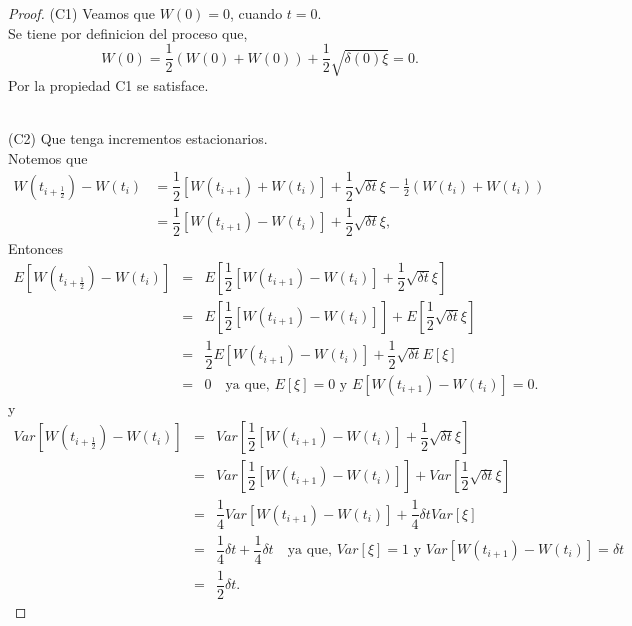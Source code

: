 \documentclass[
  letterpaper,
  DIV=11,
  numbers=noendperiod]{scrreprt}
\theoremstyle{plain}
\theoremstyle{definition}
\theoremstyle{remark}
\begin{document}
\begin{proof}

(C1) Veamos que \(W\left(0\right)=0\), cuando \(t=0\).\\
Se tiene por definicion del proceso que, \[
W\left(0\right)=\frac{1}{2}(W(0)+W(0))+\frac{1}{2}\sqrt{\delta(0)\xi}=0.
\] Por la propiedad C1 se satisface.\\
\strut \\
(C2) Que tenga incrementos estacionarios.\\
Notemos que \[
\begin{align*}
W(t_{i+\frac{1}{2}})-W(t_{i}) & = \dfrac{1}{2}\left[W\left(t_{i+1}\right)+W\left(t_{i}\right)\right]+\dfrac{1}{2}\sqrt{\delta t}\xi-\frac{1}{2}(W(t_{i})+W(t_{i}))\\
& = \dfrac{1}{2}\left[W\left(t_{i+1}\right)-W\left(t_{i}\right)\right]+\dfrac{1}{2}\sqrt{\delta t}\xi,
\end{align*}
\] Entonces \[
\begin{eqnarray*}
E\left[W(t_{i+\frac{1}{2}})-W(t_{i})\right] & = & E\left[\dfrac{1}{2}\left[W\left(t_{i+1}\right)-W\left(t_{i}\right)\right]+\dfrac{1}{2}\sqrt{\delta t}\xi\right]\\
& = & E\left[\dfrac{1}{2}\left[W\left(t_{i+1}\right)-W\left(t_{i}\right)\right]\right]+E\left[\dfrac{1}{2}\sqrt{\delta t}\xi\right]\\
& = & \dfrac{1}{2}E\left[W\left(t_{i+1}\right)-W\left(t_{i}\right)\right]+\dfrac{1}{2}\sqrt{\delta t}E\left[\xi\right]\\
& = & 0\quad\text{ya que, }E\left[\xi\right]=0\text{ y }E\left[W\left(t_{i+1}\right)-W\left(t_{i}\right)\right]=0.
\end{eqnarray*}
\] y \[
\begin{eqnarray}
Var\left[W(t_{i+\frac{1}{2}})-W(t_{i})\right]& = & Var\left[\dfrac{1}{2}\left[W\left(t_{i+1}\right)-W\left(t_{i}\right)\right]+\dfrac{1}{2}\sqrt{\delta t}\xi\right]\\
& = & Var\left[\dfrac{1}{2}\left[W\left(t_{i+1}\right)-W\left(t_{i}\right)\right]\right]+Var\left[\dfrac{1}{2}\sqrt{\delta t}\xi\right]\\
& = & \dfrac{1}{4}Var\left[W\left(t_{i+1}\right)-W\left(t_{i}\right)\right]+\dfrac{1}{4}\delta t Var\left[\xi\right]\\
& = & \dfrac{1}{4}\delta t+\dfrac{1}{4}\delta t\quad\text{ya que, }Var\left[\xi\right]=1\text{ y }Var\left[W\left(t_{i+1}\right)-W\left(t_{i}\right)\right]=\delta t\\
& = & \dfrac{1}{2}\delta t.
\end{eqnarray}
\]


\end{proof}
\end{document}
